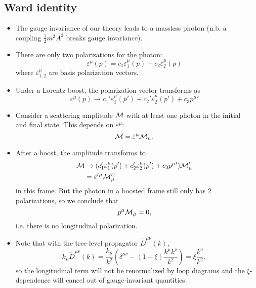 \subsection*{Ward identity}
\begin{itemize}
    \item The gauge invariance of our theory leads to a massless photon (n.b. a coupling $\frac{1}{2}m^2 A^2$ breaks gauge invariance).
    \item There are only two polarizations for the photon:
    \begin{equation}
        \varepsilon^\mu(p)=c_1 \varepsilon_1^\mu(p)+c_2 \varepsilon_2^\mu(p)
    \end{equation}
    where $\varepsilon^\mu_{1,2}$ are basis polarization vectors.
    \item Under a Lorentz boost, the polarization vector transforms as
    \begin{equation}
        \varepsilon^\mu(p)\to c_1' \varepsilon_1^\mu(p')+c_2' \varepsilon_2^\mu(p')+c_3 p^\mu{}'
    \end{equation}
    \item Consider a scattering amplitude $\mathcal{M}$ with at least one photon in the initial and final state. This depends on $\varepsilon^\mu$:
    \begin{equation*}
        \mathcal{M} = \varepsilon^\mu \mathcal{M}_\mu.
    \end{equation*}
    \item After a boost, the amplitude transforms to
    \begin{align*}
        \mathcal{M} &\to (c_1' \varepsilon_1^\mu(p')+c_2' \varepsilon_2^\mu(p')+c_3 p^\mu{}')\mathcal{M}_\mu'\\
        &= \varepsilon'{}^\mu \mathcal{M}_\mu'
    \end{align*}
    in this frame. But the photon in a boosted frame still only has 2 polarizations, so we conclude that 
    \begin{equation}
        p^\mu \mathcal{M}_\mu=0,
    \end{equation} 
    i.e. there is no longitudinal polarization.
    \item Note that with the tree-level propagator $\tilde D^{\mu\nu}(k)$,
    \begin{equation}
        k_\mu \tilde D^{\mu\nu}(k)=
        \frac{k_\mu}{k^2}(\delta^{\mu\nu}-(1-\xi)\frac{k^\mu k^\nu}{k^2})=\xi \frac{k^\nu}{k^2},
    \end{equation}
    so the longitudinal term will not be renormalized by loop diagrams and the $\xi$-dependence will cancel out of gauge-invariant quantities.
\end{itemize}